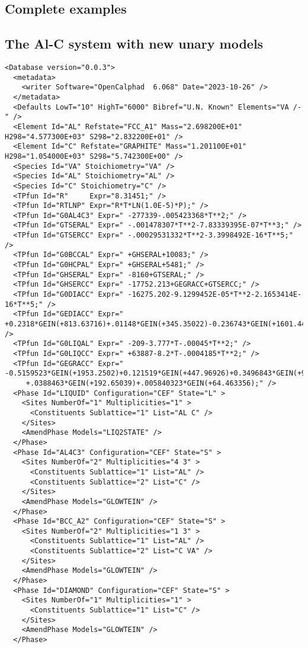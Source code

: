 \documentclass{article}
\begin{document}
\begin{appendices}
\newpage

\setcounter{equation}{0}
\renewcommand{\theequation}{D\arabic{equation}}
\setcounter{figure}{0}
\renewcommand{\thefigure}{D\arabic{figure}}

\section{Complete examples}\label{sec:complete}

\subsection{The Al-C system with new unary models}\label{sec:alc}

{\small
\begin{verbatim}
<Database version="0.0.3">
  <metadata>
    <writer Software="OpenCalphad  6.068" Date="2023-10-26" />
  </metadata>
  <Defaults LowT="10" HighT="6000" Bibref="U.N. Known" Elements="VA /-" />
  <Element Id="AL" Refstate="FCC_A1" Mass="2.698200E+01" H298="4.577300E+03" S298="2.832200E+01" />
  <Element Id="C" Refstate="GRAPHITE" Mass="1.201100E+01" H298="1.054000E+03" S298="5.742300E+00" />
  <Species Id="VA" Stoichiometry="VA" />
  <Species Id="AL" Stoichiometry="AL" />
  <Species Id="C" Stoichiometry="C" />
  <TPfun Id="R"     Expr="8.31451;" />
  <TPfun Id="RTLNP" Expr="R*T*LN(1.0E-5)*P);" />
  <TPfun Id="G0AL4C3" Expr=" -277339-.005423368*T**2;" /> 
  <TPfun Id="GTSERAL" Expr=" -.001478307*T**2-7.83339395E-07*T**3;" /> 
  <TPfun Id="GTSERCC" Expr=" -.00029531332*T**2-3.3998492E-16*T**5;" /> 
  <TPfun Id="G0BCCAL" Expr=" +GHSERAL+10083;" /> 
  <TPfun Id="G0HCPAL" Expr=" +GHSERAL+5481;" /> 
  <TPfun Id="GHSERAL" Expr=" -8160+GTSERAL;" /> 
  <TPfun Id="GHSERCC" Expr=" -17752.213+GEGRACC+GTSERCC;" /> 
  <TPfun Id="G0DIACC" Expr=" -16275.202-9.1299452E-05*T**2-2.1653414E-16*T**5;" /> 
  <TPfun Id="GEDIACC" Expr=" +0.2318*GEIN(+813.63716)+.01148*GEIN(+345.35022)-0.236743*GEIN(+1601.4467);" /> 
  <TPfun Id="G0LIQAL" Expr=" -209-3.777*T-.00045*T**2;" /> 
  <TPfun Id="G0LIQCC" Expr=" +63887-8.2*T-.0004185*T**2;" /> 
  <TPfun Id="GEGRACC" Expr=" -0.5159523*GEIN(+1953.2502)+0.121519*GEIN(+447.96926)+0.3496843*GEIN(+947.01605)
     +.0388463*GEIN(+192.65039)+.005840323*GEIN(+64.463356);" /> 
  <Phase Id="LIQUID" Configuration="CEF" State="L" >
    <Sites NumberOf="1" Multiplicities="1" >
      <Constituents Sublattice="1" List="AL C" />
    </Sites>
    <AmendPhase Models="LIQ2STATE" />
  </Phase>
  <Phase Id="AL4C3" Configuration="CEF" State="S" >
    <Sites NumberOf="2" Multiplicities="4 3" >
      <Constituents Sublattice="1" List="AL" />
      <Constituents Sublattice="2" List="C" />
    </Sites>
    <AmendPhase Models="GLOWTEIN" />
  </Phase>
  <Phase Id="BCC_A2" Configuration="CEF" State="S" >
    <Sites NumberOf="2" Multiplicities="1 3" >
      <Constituents Sublattice="1" List="AL" />
      <Constituents Sublattice="2" List="C VA" />
    </Sites>
    <AmendPhase Models="GLOWTEIN" />
  </Phase>
  <Phase Id="DIAMOND" Configuration="CEF" State="S" >
    <Sites NumberOf="1" Multiplicities="1" >
      <Constituents Sublattice="1" List="C" />
    </Sites>
    <AmendPhase Models="GLOWTEIN" />
  </Phase>



\end{verbatim}}
\end{appendices}
\end{document}
